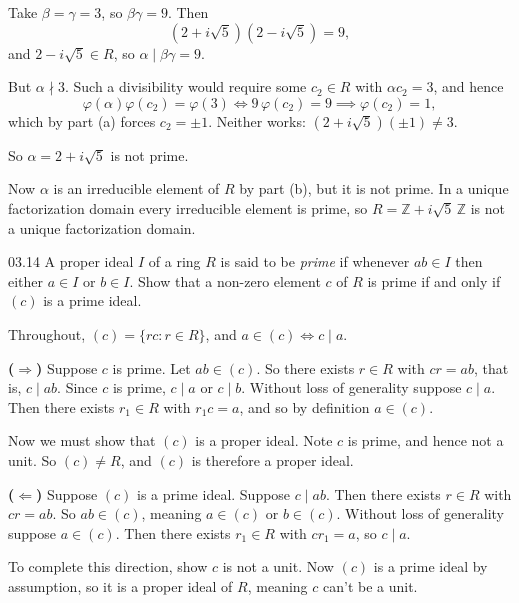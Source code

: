 \documentclass[11pt]{article}
\begin{document}
\begin{solution}
  Take $\beta = \gamma = 3$, so $\beta\gamma = 9$. Then
  \[
    (2 + i\sqrt{5})(2 - i\sqrt{5}) = 9,
  \]
  and $2 - i\sqrt{5} \in R$, so $\alpha \mid \beta\gamma = 9$.

  But $\alpha \nmid 3$. Such a divisibility would require some $c_{2} \in R$
  with $\alpha c_{2} = 3$, and hence
  \[
    \varphi(\alpha)\varphi(c_{2}) = \varphi(3)
    \iff 9\,\varphi(c_{2}) = 9
    \implies \varphi(c_{2}) = 1,
  \]
  which by part (a) forces $c_{2} = \pm 1$. Neither works:
  $(2 + i\sqrt{5})(\pm 1) \neq 3$.

  So $\alpha = 2 + i\sqrt{5}$ is not prime.

  Now $\alpha$ is an irreducible element of $R$ by part (b), but it is not
  prime. In a unique factorization domain every irreducible element is prime, so
  $R = \mathbb{Z} + i\sqrt{5}\,\mathbb{Z}$ is not a unique factorization domain.
\end{solution}

\begin{problem}{03.14}
  A proper ideal $I$ of a ring $R$ is said to be \emph{prime} if whenever
  $ab \in I$ then either $a \in I$ or $b \in I$. Show that a non-zero element
  $c$ of $R$ is prime if and only if $(c)$ is a prime ideal.
\end{problem}
\begin{solution}
  Throughout, $(c) = \{rc : r \in R\}$, and $a \in (c) \iff c \mid a$.

  \medskip
  \textbf{($\Rightarrow$)} Suppose $c$ is prime. Let $ab \in (c)$. So there
  exists $r \in R$ with $cr = ab$, that is, $c \mid ab$. Since $c$ is prime,
  $c \mid a$ or $c \mid b$. Without loss of generality suppose $c \mid a$. Then
  there exists $r_{1} \in R$ with $r_{1}c = a$, and so by definition
  $a \in (c)$.

  Now we must show that $(c)$ is a proper ideal. Note $c$ is prime, and hence
  not a unit. So $(c) \neq R$, and $(c)$ is therefore a proper ideal.

  \medskip
  \textbf{($\Leftarrow$)} Suppose $(c)$ is a prime ideal. Suppose $c \mid ab$.
  Then there exists $r \in R$ with $cr = ab$. So $ab \in (c)$, meaning
  $a \in (c)$ or $b \in (c)$. Without loss of generality suppose $a \in (c)$.
  Then there exists $r_{1} \in R$ with $cr_{1} = a$, so $c \mid a$.

  To complete this direction, show $c$ is not a unit. Now $(c)$ is a prime ideal
  by assumption, so it is a proper ideal of $R$, meaning $c$ can't be a unit.
\end{solution}
\end{document}
